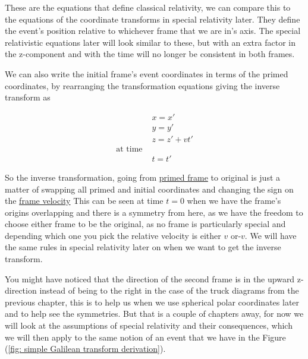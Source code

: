 These are the equations that define classical relativity, we can compare this to the equations of the coordinate transforms in special relativity later. They define the event's position relative to whichever frame that we are in's axis. The special relativistic equations later will look similar to these, but with an extra factor in the z-component and with the time will no longer be consistent in both frames.

We can also write the initial frame's event coordinates in terms of the primed coordinates, by rearranging the transformation equations giving the inverse transform as

\begin{equation}
	\begin{aligned}
		 & {x} = {x{'}}             \\
		 & {y} = {y{'}}             \\
		 & {z} = {z{'}} + {v}{t{'}} \\
		\text{at time \ \ \ }       \\
		 & {t} = {t{'}}
	\end{aligned}
	\label{eq: Inverse Galilean transformation}
\end{equation}

So the inverse transformation, going from \hyperlink{def-Primed-Frame}{primed frame} to original is just a matter of swapping all primed and initial coordinates and changing the sign on the \hyperlink{def-frame-velocity}{frame velocity}
This can be seen at time ${t} = 0$ when we have the frame's origins overlapping and there is a symmetry from here, as we have the freedom to choose either frame to be the original, as no frame is particularly special and depending which one you pick the relative velocity is either ${v}$ or-${v}$. We will have the same rules in special relativity later on when we want to get the inverse transform.

You might have noticed that the direction of the second frame is in the upward z-direction instead of being to the right in the case of the truck diagrams from the previous chapter, this is to help us when we use spherical polar coordinates later and to help see the symmetries. But that is a couple of chapters away, for now we will look at the assumptions of special relativity and their consequences, which we will then apply to the same notion of an event that we have in the Figure (\ref{fig: simple Galilean transform derivation}).

